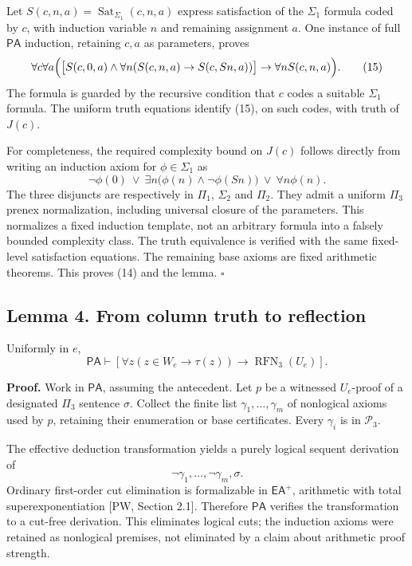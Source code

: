 \documentclass[
  11pt,
  letterpaper,
]{article}
\begin{document}
Let \(S(c,n,a)=\operatorname{Sat}_{\Sigma_1}(c,n,a)\) express
satisfaction of the \(\Sigma_1\) formula coded by \(c\), with induction
variable \(n\) and remaining assignment \(a\). One instance of full
\(\mathsf{PA}\) induction, retaining \(c,a\) as parameters, proves \[
\forall c\forall a\Bigl(
\bigl[S(c,0,a)\wedge\forall n(S(c,n,a)\rightarrow S(c,Sn,a))\bigr]
\rightarrow\forall n S(c,n,a)\Bigr).
\tag{15}
\] The formula is guarded by the recursive condition that \(c\) codes a
suitable \(\Sigma_1\) formula. The uniform truth equations identify
(15), on such codes, with truth of \(J(c)\).

For completeness, the required complexity bound on \(J(c)\) follows
directly from writing an induction axiom for \(\phi\in\Sigma_1\) as \[
\neg\phi(0)\ \vee\
\exists n\bigl(\phi(n)\wedge\neg\phi(Sn)\bigr)
\ \vee\ \forall n\phi(n).
\tag{16}
\] The three disjuncts are respectively in \(\Pi_1\), \(\Sigma_2\) and
\(\Pi_2\). They admit a uniform \(\Pi_3\) prenex normalization,
including universal closure of the parameters. This normalizes a fixed
induction template, not an arbitrary formula into a falsely bounded
complexity class. The truth equivalence is verified with the same
fixed-level satisfaction equations. The remaining base axioms are fixed
arithmetic theorems. This proves (14) and the lemma. \hfill\(\square\)

\subsection{Lemma 4. From column truth to
reflection}\label{lemma-4.-from-column-truth-to-reflection}

Uniformly in \(e\), \[
\mathsf{PA}\vdash
\left[\forall z(z\in W_e\rightarrow\tau(z))
\rightarrow\operatorname{RFN}_3(U_e)\right].
\tag{17}
\]

\textbf{Proof.} Work in \(\mathsf{PA}\), assuming the antecedent. Let
\(p\) be a witnessed \(U_e\)-proof of a designated \(\Pi_3\) sentence
\(\sigma\). Collect the finite list \(\gamma_1,\ldots,\gamma_m\) of
nonlogical axioms used by \(p\), retaining their enumeration or base
certificates. Every \(\gamma_i\) is in \(\mathcal P_3\).

The effective deduction transformation yields a purely logical sequent
derivation of \[
\neg\gamma_1,\ldots,\neg\gamma_m,\sigma.
\tag{18}
\] Ordinary first-order cut elimination is formalizable in
\(\mathsf{EA}^+\), arithmetic with total superexponentiation {[}PW,
Section 2.1{]}. Therefore \(\mathsf{PA}\) verifies the transformation to
a cut-free derivation. This eliminates logical cuts; the induction
axioms were retained as nonlogical premises, not eliminated by a claim
about arithmetic proof strength.
\end{document}
